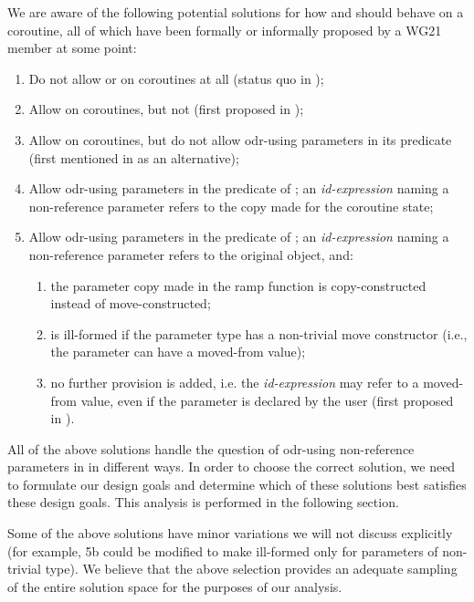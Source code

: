 We are aware of the following potential solutions for how  and  should behave on a coroutine, all of which have been formally or informally proposed by a WG21 member at some point:
\begin{enumerate}
\item Do not allow  or  on coroutines at all (status quo in \cite{P2900R8});
\item Allow  on coroutines, but not  (first proposed in \cite{P2957R1});
\item Allow  on coroutines, but do not allow odr-using parameters in its predicate (first mentioned in \cite{P2957R1} as an alternative);
\item Allow odr-using parameters in the predicate of ; an \emph{id-expression} naming a non-reference parameter refers to the copy made for the coroutine state;
\item Allow odr-using parameters in the predicate of ; an \emph{id-expression} naming a non-reference parameter refers to the original object, and:
\begin{enumerate}[label=\alph*.,ref=\theenumi\alph*]
        \item the parameter copy made in the ramp function is copy-constructed instead of move-constructed;
        \item is ill-formed if the parameter type has a non-trivial move constructor (i.e., the parameter can have a moved-from value);
        \item no further provision is added, i.e. the \emph{id-expression} may refer to a moved-from value, even if the parameter is declared  by the user (first proposed in \cite{P2957R0}).
\end{enumerate}
\end{enumerate}
All of the above solutions handle the question of odr-using non-reference parameters in  in different ways. In order to choose the correct solution, we need to formulate our design goals and determine which of these solutions best satisfies these design goals. This analysis is performed in the following section.

Some of the above solutions have minor variations we will not discuss explicitly (for example, 5b could be modified to make  ill-formed only for parameters of non-trivial type). We believe that the above selection provides an adequate sampling of the entire solution space for the purposes of our analysis.

